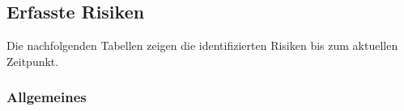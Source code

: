 \documentclass[main.tex]{subfiles} %
\begin{document}

\subsection*{Erfasste Risiken}

Die nachfolgenden Tabellen zeigen die identifizierten Risiken bis zum aktuellen
Zeitpunkt. \\


\subsubsection*{Allgemeines}

\setcounter{Erfasste_Risiken_counter_allg}{0}
\end{document}
